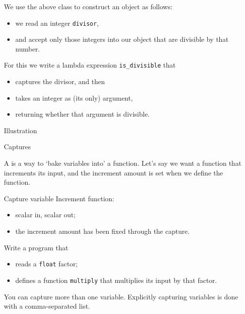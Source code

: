 We use the above class to construct an object as follows:
\begin{itemize}
\item we read an integer \lstinline{divisor},
\item and accept only those integers into our object
  that are divisible by that number.
\end{itemize}
For this we write a lambda expression \lstinline{is_divisible} that 
\begin{itemize}
\item captures the divisor, and then
\item takes an integer as (its only) argument,
\item returning whether that argument is divisible.
\end{itemize}

\begin{block}{Illustration}
  \label{sl:lambda-classed}
\end{block}

 {Captures}

A  is a way to `bake variables into' a function.
Let's say we want a function that increments its input,
and the increment amount is set when we define the function.

\begin{block}{Capture variable}
  \label{sl:capture-increment}
  Increment function:
  \begin{itemize}
  \item scalar in, scalar out;
  \item the increment amount has been fixed through the capture.
  \end{itemize}
  \def\snippetcodefraction{.67}
  \def\snippetanswfraction{.3}  
\end{block}

\begin{exercise}
  \label{ex:capture-factor}
  Write a program that 
  \begin{itemize}
  \item reads a \lstinline{float} factor;
  \item defines a function \lstinline{multiply} that
    multiplies its input by that factor.
  \end{itemize}
\end{exercise}

You can capture more than one variable.
Explicitly capturing variables is done with a comma-separated list.

